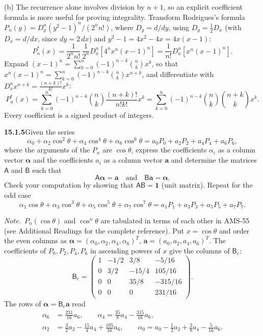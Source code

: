 (b) The recurrence alone involves division by $n+1$, so an explicit
coefficient formula is more useful for proving integrality.
Transform Rodrigues's formula
$P_n(y)=D_y^n(y^2-1)^n/(2^nn!)$, where $D_y=d/dy$, using
$D_y=\tfrac12D_x$ (with $D_x=d/dx$, since $dy=2\,dx$) and
$y^2-1=4x^2-4x=4x(x-1)$:
\[
P_n^*(x)=\frac1{2^nn!}\,\frac1{2^n}D_x^n[4^nx^n(x-1)^n]
=\frac1{n!}D_x^n[x^n(x-1)^n].
\]
Expand $(x-1)^n=\sum_{k=0}^n(-1)^{n-k}\binom nk x^k$, so that
$x^n(x-1)^n=\sum_{k=0}^n(-1)^{n-k}\binom nk x^{n+k}$, and differentiate
with $D_x^nx^{n+k}=\frac{(n+k)!}{k!}x^k$:
\[
P_n^*(x)=\sum_{k=0}^n(-1)^{n-k}
\binom nk\frac{(n+k)!}{n!k!}x^k
=\boxed{\sum_{k=0}^n(-1)^{n-k}\binom nk\binom{n+k}{k}x^k}.
\]
Every coefficient is a signed product of integers.

\par\bigskip
\noindent\textbf{15.1.5}\quad Given the series
\[
\alpha_{0}+\alpha_{2}\cos^{2}\theta+\alpha_{4}\cos^{4}\theta
+\alpha_{6}\cos^{6}\theta=a_{0}P_{0}+a_{2}P_{2}+a_{4}P_{4}+a_{6}P_{6},
\]
where the arguments of the $P_{n}$ are $\cos\theta$, express the
coefficients $\alpha_{i}$ as a column vector $\boldsymbol{\alpha}$ and
the coefficients $a_{i}$ as a column vector $\mathbf{a}$ and determine
the matrices $\mathsf{A}$ and $\mathsf{B}$ such that
\[
\mathsf{A}\boldsymbol{\alpha}=\mathbf{a}
\quad\text{and}\quad\mathsf{B}\mathbf{a}=\boldsymbol{\alpha}.
\]
Check your computation by showing that $\mathsf{AB}=\mathbf{1}$ (unit
matrix). Repeat for the odd case
\[
\alpha_{1}\cos\theta+\alpha_{3}\cos^{3}\theta+\alpha_{5}\cos^{5}\theta
+\alpha_{7}\cos^{7}\theta=a_{1}P_{1}+a_{3}P_{3}+a_{5}P_{5}+a_{7}P_{7}.
\]
\par\emph{Note.}~$P_{n}(\cos\theta)$ and $\cos^{n}\theta$ are
tabulated in terms of each other in AMS-55 (see Additional Readings
for the complete reference).
\solution
Put $x=\cos\theta$ and order the even columns as
$\boldsymbol\alpha=(\alpha_0,\alpha_2,\alpha_4,\alpha_6)^T$,
$\mathbf a=(a_0,a_2,a_4,a_6)^T$. The coefficients of
$P_0,P_2,P_4,P_6$ in ascending powers of $x$ give the columns of
$\mathsf B_e$:
\[
\boxed{\mathsf B_e=
\begin{pmatrix}
1&-1/2&3/8&-5/16\\
0&3/2&-15/4&105/16\\
0&0&35/8&-315/16\\
0&0&0&231/16
\end{pmatrix}}.
\]
The rows of $\boldsymbol\alpha=\mathsf B_e\mathbf a$ read
\begin{align*}
\alpha_6&=\tfrac{231}{16}a_6,\qquad
\alpha_4=\tfrac{35}8a_4-\tfrac{315}{16}a_6,\\
\alpha_2&=\tfrac32a_2-\tfrac{15}4a_4+\tfrac{105}{16}a_6,\qquad
\alpha_0=a_0-\tfrac12a_2+\tfrac38a_4-\tfrac5{16}a_6.
\end{align*}
